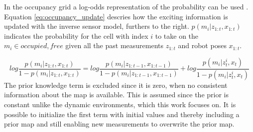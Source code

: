 In the occupancy grid a log-odds representation of the probability can be used \cite{probRob}. 
Equation \ref{eq:occupancy_update} descries how the exciting information is updated with the inverse sensor model, furthers to the right. $p(m_i|z_{1:t},x_{1:t})$ indicates the probability for the cell with index $i$ to take on the $m_i \in {occupied,free}$ given all the past measurements $z_{1:t}$ and robot poses $x_{1:t}$. 

\begin{equation}
	log \frac{p(m_i|z_{1:t},x_{1:t})}{1-p(m_i|z_{1:t},x_{1:t})} = log \frac{p(m_i|z_{1:t-1},x_{1:t-1})}{1-p(m_i|z_{1:t-1},x_{1:t-1})} + log \frac{ p(m_i | z_t^i,x_t) }{ 1 - p(m_i | z_t^i,x_t) }
	\label{eq:occupancy_update}
\end{equation}
The prior knowledge term is excluded since it is zero, when no consistent information about the map is available. 
This is assumed since the prior is constant unlike the dynamic environments, which this work focuses on.
It is possible to initialize the first term with initial values and thereby including a prior map and still enabling new measurements to overwrite the prior map. 

